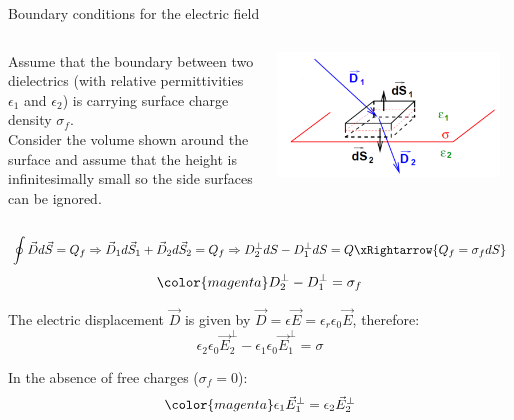 \begin{frame}{Boundary conditions for the electric field}

\begin{columns}
  \begin{column}{0.50\textwidth}
   {\small
     Assume that the boundary between two dielectrics (with relative
     permittivities $\epsilon_1$ and  $\epsilon_2$)
     is carrying surface charge density $\sigma_f$.\\
     Consider the volume shown around the surface and
     assume that the height is infinitesimally small so the side
     surfaces can be ignored.
  }
  \end{column}
  \begin{column}{0.50\textwidth}
    \begin{center}
      \includegraphics[width=0.95\textwidth]{./images/schematics/boundary_conditions_electric_field_1.png}\\
    \end{center}
  \end{column}
\end{columns}

\begin{equation*}
  \oint \vec{D} d\vec{S} = Q_f \Rightarrow
     \vec{D}_1 d\vec{S}_1 + \vec{D}_2 d\vec{S}_2 = Q_f \Rightarrow
       D_2^{\perp} dS - D_1^{\perp} dS = Q \xRightarrow{Q_f = \sigma_f dS}
\end{equation*}
\begin{equation*}
         {\color{magenta}D_2^{\perp} - D_1^{\perp} = \sigma_f}
\end{equation*}

The electric displacement $\vec{D}$ is given by
$\displaystyle \vec{D} = \epsilon \vec{E} = \epsilon_r \epsilon_0 \vec{E}$,
therefore:
\begin{equation*}
   \epsilon_2 \epsilon_0 \vec{E}_2^{\perp} - \epsilon_1 \epsilon_0 \vec{E}_1^{\perp} = \sigma
\end{equation*}

In the absence of free charges ($\sigma_f=0$):
\begin{equation*}
   {\color{magenta} \epsilon_1 \vec{E}_1^{\perp} = \epsilon_2 \vec{E}_2^{\perp} }
\end{equation*}

\end{frame}


